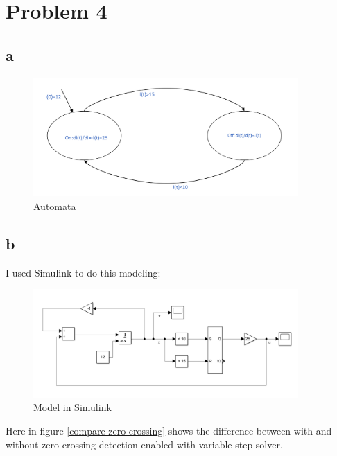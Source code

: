 \section{Problem 4}

\subsection{a}

\begin{figure}[H]
 \centering
 \includegraphics[width=0.9\textwidth]{images/automataa.png}
 \caption{Automata}
 \label{a}
\end{figure}

\subsection{b}

I used Simulink to do this modeling:
\begin{figure}[H]
 \centering
 \includegraphics[width=0.9\textwidth]{images/model.png}
 \caption{Model in Simulink}
 \label{model}
\end{figure}

Here in figure \ref{compare-zero-crossing} shows the difference between with and without zero-crossing detection enabled with variable step solver.

